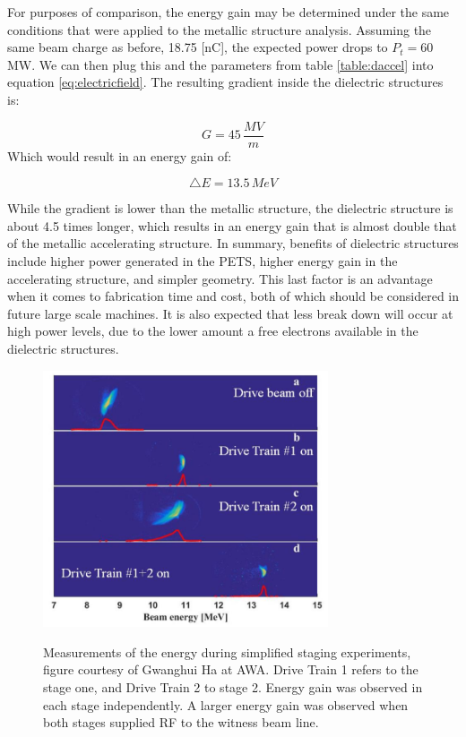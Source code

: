 For purposes of comparison, the energy gain may be determined under the same conditions 
that were applied to the metallic structure analysis. Assuming the same beam charge as before, 18.75 [nC], 
the expected power drops to $P_t=60\,$ MW. 
We can then plug this and the parameters from table \ref{table:daccel} into equation \ref{eq:electricfield}. 
The resulting gradient inside the dielectric structures is: 

\begin{equation}
G = 45\,\frac{MV}{m}
\end{equation}
Which would result in an energy gain of: 

\begin{equation}
\triangle E = 13.5\,MeV
\end{equation}

While the gradient is lower than the metallic structure, the dielectric 
structure is about 4.5 times longer, which results in an energy gain that is 
almost double that of the metallic accelerating structure.
In summary, benefits of dielectric structures include higher power
generated in the PETS, higher energy gain in the accelerating structure, 
and simpler geometry. This last factor is an advantage when it comes 
to fabrication time and cost, both of which should be considered
in future large scale machines. It is also expected that less break 
down will occur at high power levels, due to the lower amount
a free electrons available in the dielectric structures. 






\begin{figure}
	\centering
	\includegraphics[width=0.75\textwidth]{images/old_tba}
	\label{fig:old-tba}
	\caption{Measurements of the energy during simplified staging experiments, 
		figure courtesy of Gwanghui Ha at AWA.
		Drive Train 1 refers to the stage one, and Drive Train 2 to stage 2. 
		Energy gain was observed in each stage independently.
		A larger energy gain was observed when both stages supplied RF to the witness beam line.}
\end{figure}




